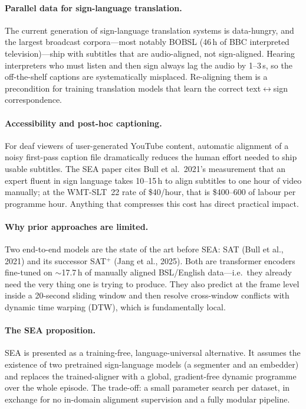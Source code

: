 \documentclass[11pt,a4paper]{article}
\def\emph#1{#1}%
\begin{document}
\paragraph{Parallel data for sign-language translation.} The current generation
of sign-language translation systems
\cite{muller-etal-2022-findings,muller-etal-2023-findings}
is data-hungry, and the largest broadcast corpora---most notably BOBSL
(46\,h of BBC interpreted television)---ship with subtitles that are
\emph{audio-aligned}, not \emph{sign-aligned}. Hearing interpreters who must
listen and then sign always lag the audio by 1--3\,s, so the off-the-shelf
captions are systematically misplaced. Re-aligning them is a precondition for
training translation models that learn the correct text$\leftrightarrow$sign
correspondence.

\paragraph{Accessibility and post-hoc captioning.} For deaf viewers of
user-generated YouTube content, automatic alignment of a noisy first-pass
caption file dramatically reduces the human effort needed to ship usable
subtitles. The SEA paper cites Bull et al.\ 2021's measurement that an expert
fluent in sign language takes 10--15\,h to align subtitles to one hour of
video manually; at the WMT-SLT~22 rate of \$40/hour, that is \$400--600 of
labour per programme hour. Anything that compresses this cost has direct
practical impact.

\paragraph{Why prior approaches are limited.} Two end-to-end models are the
state of the art before SEA: \emph{SAT} (Bull et al., 2021) and its successor
\emph{SAT$^{+}$} (Jang et al., 2025). Both are transformer encoders fine-tuned
on $\sim$17.7\,h of \emph{manually aligned} BSL/English data---i.e.\ they
already need the very thing one is trying to produce. They also predict at the
frame level inside a 20-second sliding window and then resolve cross-window
conflicts with dynamic time warping (DTW), which is fundamentally local.

\paragraph{The SEA proposition.} SEA is presented as a \emph{training-free,
language-universal} alternative. It assumes the existence of two pretrained
sign-language models (a segmenter and an embedder) and replaces the
trained-aligner with a global, gradient-free dynamic programme over the
\emph{whole episode}. The trade-off: a small parameter search per dataset, in
exchange for no in-domain alignment supervision and a fully modular pipeline.
\end{document}
